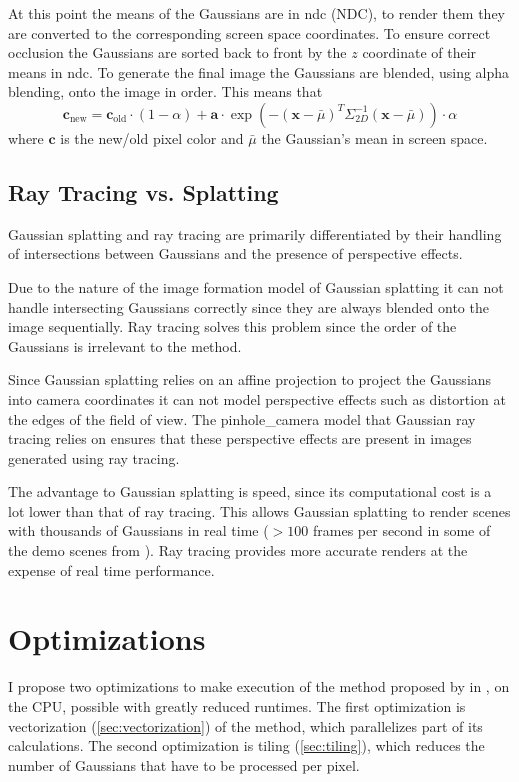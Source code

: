 \documentclass[a4paper, 11pt]{memoir}
\begin{document}
    At this point the means of the Gaussians are in \gls{ndc} (NDC), to render them they are converted to the corresponding
    screen space coordinates. To ensure correct occlusion the Gaussians are sorted back to front by the $z$ coordinate of
    their means in \gls{ndc}. To generate the final image the Gaussians are blended, using alpha blending, onto the image
    in order. This means that
    \begin{equation}
        \mathbf{c}_{\text{new}} = \mathbf{c}_{\text{old}} \cdot (1 - \alpha) + \mathbf{a} \cdot \exp{\left(-(\mathbf{x} - \bar{\mu})^T\Sigma_{2D}^{-1}(\mathbf{x} - \bar{\mu})\right)} \cdot \alpha
    \end{equation}
    where $\mathbf{c}$ is the new/old pixel color and $\bar{\mu}$ the Gaussian's mean in screen space.

    \section{Ray Tracing vs. Splatting}
    \label{sec:ray_v_splat}
    Gaussian splatting and ray tracing are primarily differentiated by their handling of intersections between Gaussians
    and the presence of perspective effects.

    Due to the nature of the image formation model of Gaussian splatting it can not handle intersecting Gaussians correctly
    since they are always blended onto the image sequentially. Ray tracing solves this problem since the order of the
    Gaussians is irrelevant to the method.

    Since Gaussian splatting relies on an affine projection to project the Gaussians into camera coordinates it can not
    model perspective effects such as distortion at the edges of the field of view. The \gls{pinhole_camera} model that
    Gaussian ray tracing relies on ensures that these perspective effects are present in images generated using ray
    tracing.

    The advantage to Gaussian splatting is speed, since its computational cost is a lot lower than that of ray tracing.
    This allows Gaussian splatting to render scenes with thousands of Gaussians in real time ($>100$ frames per second
    in some of the demo scenes from \cite{kerbl3Dgaussians}). Ray tracing provides more accurate renders at the expense
    of real time performance.

    \chapter{Optimizations}
    \label{ch:optimizations}
    I propose two optimizations to make execution of the method proposed by \citeauthor{Rhodin:2015}
    in \cite{Rhodin:2015}, on the CPU, possible with greatly reduced runtimes.
    The first optimization is vectorization (\ref{sec:vectorization}) of the method, which parallelizes part of its
    calculations. The second optimization is tiling (\ref{sec:tiling}), which reduces the number of Gaussians
    that have to be processed per pixel.
\end{document}
